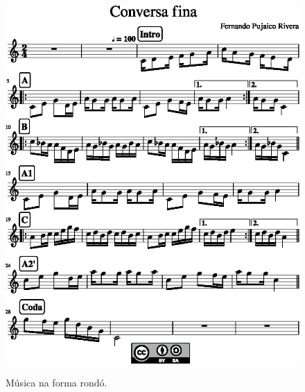 \newpage
     \begin{figure}[!ht]
	     \centering
	     \href{https://drive.google.com/file/d/1eIO8uOb6IEr4pKfd2zZi1XfJvtqhbAPj/view?usp=sharing}{\includegraphics[width=1.0\textwidth]{chapters/cap-musica-topicos/section-choro-1.eps}}
	     \caption{Música na forma rondó.}
	     \label{fig:section-choro}
     \end{figure}

\newpage


